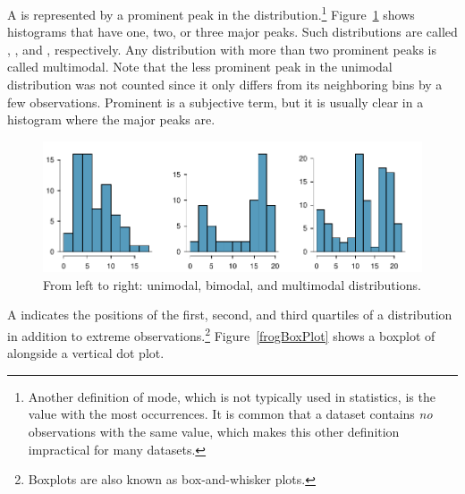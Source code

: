 \textD{\newpage}

A  is represented by a prominent peak in the distribution.\footnote{Another definition of mode, which is not typically used in statistics, is the value with the most occurrences. It is common that a dataset contains \emph{no} observations with the same value, which makes this other definition impractical for many datasets.} Figure~\ref{singleBiMultiModalPlots} shows histograms that have one, two, or three major peaks. Such distributions are called , , and , respectively. Any distribution with more than two prominent peaks is called multimodal. Note that the less prominent peak in the unimodal distribution was not counted since it only differs from its neighboring bins by a few observations. Prominent is a subjective term, but it is usually clear in a histogram where the major peaks are.  

\begin{figure}[h]
	\centering
	\includegraphics[width=\textwidth]{ch_01a_intro_to_data_oi_biostat/figures/singleBiMultiModalPlots/singleBiMultiModalPlots}
	\caption{From left to right: unimodal, bimodal, and multimodal distributions.}
	\label{singleBiMultiModalPlots}
\end{figure}

A  indicates the positions of the first, second, and third quartiles of a distribution in addition to extreme observations.\footnote{Boxplots are also known as box-and-whisker plots.} Figure~\ref{frogBoxPlot} shows a boxplot of  alongside a vertical dot plot.

